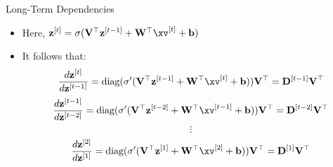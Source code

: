 \begin{vbframe}{Long-Term Dependencies}
  
  \begin{itemize}
    \item Here, $\mathbf{z}^{[t]} = \sigma(\mathbf{V}^\top \mathbf{z}^{[t-1]} + \mathbf{W}^\top \xv^{[t]} + \mathbf{b})$
    \item It follows that:
    $$ \frac{d \mathbf{z}^{[t]}}{d\mathbf{z}^{[t-1]}} = \text{diag}(\sigma' (\mathbf{V}^\top \mathbf{z}^{[t-1]} + \mathbf{W}^\top \xv^{[t]} + \mathbf{b})) \mathbf{V}^\top = \mathbf{D}^{[t-1]} \mathbf{V}^\top $$
    $$ \frac{d \mathbf{z}^{[t-1]}}{d\mathbf{z}^{[t-2]}} = \text{diag}(\sigma' (\mathbf{V}^\top \mathbf{z}^{[t-2]} + \mathbf{W}^\top \xv^{[t-1]} + \mathbf{b})) \mathbf{V}^\top= \mathbf{D}^{[t-2]} \mathbf{V}^\top $$
    $$ \vdots $$
    $$ \frac{d \mathbf{z}^{[2]}}{d\mathbf{z}^{[1]}} = \text{diag}(\sigma' (\mathbf{V}^\top \mathbf{z}^{[1]} + \mathbf{W}^\top \xv^{[2]} + \mathbf{b})) \mathbf{V}^\top = \mathbf{D}^{[1]} \mathbf{V}^\top $$
    

\end{itemize}
\end{vbframe}
